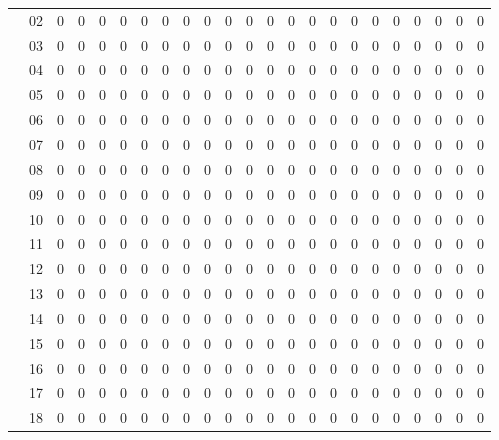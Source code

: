 \documentclass[12pt,a4paper]{article}
\begin{document}
\begin{center}
{\begin{tabular}{|c c c c c c c c c c c c c c c c c c c c c c c|}
			&\multicolumn{1}{c|}{02} & 0 & 0 & 0 & 0 & 0 & 0 & 0 & 0 & 0 & 0 & 0 & 0 & 0 & 0 & 0 & 0 & 0 & 0 & 0 & 0 & 0 \\
			&\multicolumn{1}{c|}{03} & 0 & 0 & 0 & 0 & 0 & 0 & 0 & 0 & 0 & 0 & 0 & 0 & 0 & 0 & 0 & 0 & 0 & 0 & 0 & 0 & 0 \\
			&\multicolumn{1}{c|}{04} & 0 & 0 & 0 & 0 & 0 & 0 & 0 & 0 & 0 & 0 & 0 & 0 & 0 & 0 & 0 & 0 & 0 & 0 & 0 & 0 & 0 \\
			&\multicolumn{1}{c|}{05} & 0 & 0 & 0 & 0 & 0 & 0 & 0 & 0 & 0 & 0 & 0 & 0 & 0 & 0 & 0 & 0 & 0 & 0 & 0 & 0 & 0 \\
            &\multicolumn{1}{c|}{06} & 0 & 0 & 0 & 0 & 0 & 0 & 0 & 0 & 0 & 0 & 0 & 0 & 0 & 0 & 0 & 0 & 0 & 0 & 0 & 0 & 0 \\
            &\multicolumn{1}{c|}{07} & 0 & 0 & 0 & 0 & 0 & 0 & 0 & 0 & 0 & 0 & 0 & 0 & 0 & 0 & 0 & 0 & 0 & 0 & 0 & 0 & 0 \\
            &\multicolumn{1}{c|}{08} & 0 & 0 & 0 & 0 & 0 & 0 & 0 & 0 & 0 & 0 & 0 & 0 & 0 & 0 & 0 & 0 & 0 & 0 & 0 & 0 & 0 \\
            &\multicolumn{1}{c|}{09} & 0 & 0 & 0 & 0 & 0 & 0 & 0 & 0 & 0 & 0 & 0 & 0 & 0 & 0 & 0 & 0 & 0 & 0 & 0 & 0 & 0 \\
            &\multicolumn{1}{c|}{10} & 0 & 0 & 0 & 0 & 0 & 0 & 0 & 0 & 0 & 0 & 0 & 0 & 0 & 0 & 0 & 0 & 0 & 0 & 0 & 0 & 0 \\
            &\multicolumn{1}{c|}{11} & 0 & 0 & 0 & 0 & 0 & 0 & 0 & 0 & 0 & 0 & 0 & 0 & 0 & 0 & 0 & 0 & 0 & 0 & 0 & 0 & 0 \\
            &\multicolumn{1}{c|}{12} & 0 & 0 & 0 & 0 & 0 & 0 & 0 & 0 & 0 & 0 & 0 & 0 & 0 & 0 & 0 & 0 & 0 & 0 & 0 & 0 & 0 \\
            &\multicolumn{1}{c|}{13} & 0 & 0 & 0 & 0 & 0 & 0 & 0 & 0 & 0 & 0 & 0 & 0 & 0 & 0 & 0 & 0 & 0 & 0 & 0 & 0 & 0 \\
            &\multicolumn{1}{c|}{14} & 0 & 0 & 0 & 0 & 0 & 0 & 0 & 0 & 0 & 0 & 0 & 0 & 0 & 0 & 0 & 0 & 0 & 0 & 0 & 0 & 0 \\
            &\multicolumn{1}{c|}{15} & 0 & 0 & 0 & 0 & 0 & 0 & 0 & 0 & 0 & 0 & 0 & 0 & 0 & 0 & 0 & 0 & 0 & 0 & 0 & 0 & 0 \\
            &\multicolumn{1}{c|}{16} & 0 & 0 & 0 & 0 & 0 & 0 & 0 & 0 & 0 & 0 & 0 & 0 & 0 & 0 & 0 & 0 & 0 & 0 & 0 & 0 & 0 \\
            &\multicolumn{1}{c|}{17} & 0 & 0 & 0 & 0 & 0 & 0 & 0 & 0 & 0 & 0 & 0 & 0 & 0 & 0 & 0 & 0 & 0 & 0 & 0 & 0 & 0 \\
            &\multicolumn{1}{c|}{18} & 0 & 0 & 0 & 0 & 0 & 0 & 0 & 0 & 0 & 0 & 0 & 0 & 0 & 0 & 0 & 0 & 0 & 0 & 0 & 0 & 0 \\

\end{tabular}}
\end{center}
\end{document}
